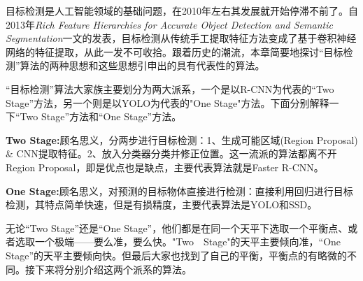目标检测是人工智能领域的基础问题，在2010年左右其发展就开始停滞不前了。自2013年\textit{Rich Feature Hierarchies for Accurate Object Detection and Semantic Segmentation}\cite{rcnn}一文的发表，目标检测从传统手工提取特征方法变成了基于卷积神经网络的特征提取，从此一发不可收拾。跟着历史的潮流，本章简要地探讨“目标检测”算法的两种思想和这些思想引申出的具有代表性的算法。

“目标检测”算法大家族主要划分为两大派系，一个是以R-CNN为代表的“Two Stage”方法，另一个则是以YOLO为代表的"One Stage"方法。下面分别解释一下“Two Stage”方法和“One Stage”方法。

\textbf{Two Stage:}顾名思义，分两步进行目标检测：1、生成可能区域(Region Proposal) \& CNN提取特征。2、放入分类器分类并修正位置。这一流派的算法都离不开Region Proposal，即是优点也是缺点，主要代表算法就是Faster R-CNN。

\textbf{One Stage:}顾名思义，对预测的目标物体直接进行检测：直接利用回归进行目标检测，其特点简单快速，但是有损精度，主要代表算法是YOLO和SSD。

无论“Two Stage”还是“One Stage”，他们都是在同一个天平下选取一个平衡点、或者选取一个极端——要么准，要么快。"Two　Stage"的天平主要倾向准，“One Stage”的天平主要倾向快。但最后大家也找到了自己的平衡，平衡点的有略微的不同。接下来将分别介绍这两个派系的算法。

